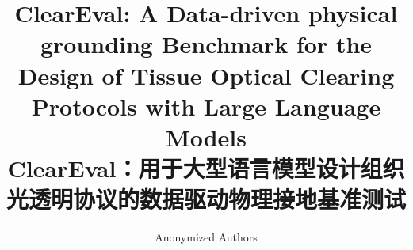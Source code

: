 \documentclass[runningheads]{llncs}
\begin{document}
\title{ClearEval: A Data-driven physical grounding Benchmark
for the Design of Tissue Optical Clearing Protocols with Large Language Models\\
\vspace{0.5cm} \large ClearEval：用于大型语言模型设计组织光透明协议的数据驱动物理接地基准测试}

\author{Anonymized Authors}

\maketitle
\end{document}
